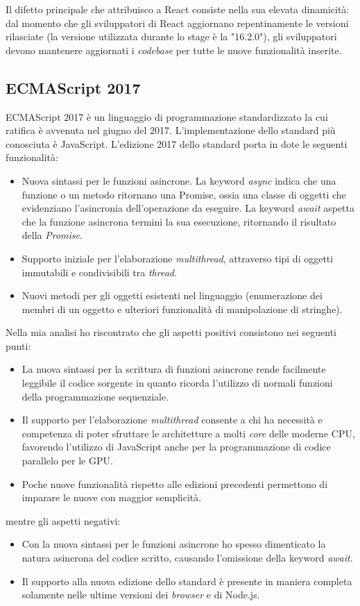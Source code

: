 Il difetto principale che attribuisco a React consiste nella sua elevata dinamicità: dal momento che gli sviluppatori di React aggiornano repentinamente le versioni rilasciate (la versione utilizzata durante lo stage è la "16.2.0"), gli sviluppatori devono mantenere aggiornati i \emph{codebase} per tutte le nuove funzionalità inserite.

\subsection{ECMAScript 2017}

ECMAScript 2017 è un linguaggio di programmazione standardizzato la cui ratifica è avvenuta nel giugno del 2017. L'implementazione dello standard più conosciuta è JavaScript.
L'edizione 2017 dello standard porta in dote le seguenti funzionalità:
\begin{itemize}
	\item Nuova sintassi per le funzioni asincrone. La keyword \emph{async} indica che una funzione o un metodo ritornano una Promise, ossia una classe di oggetti che evidenziano l'asincronia dell'operazione da eseguire. La keyword \emph{await} aspetta che la funzione asincrona termini la sua esecuzione, ritornando il risultato della \emph{Promise}.
	\item Supporto iniziale per l'elaborazione \emph{multithread}, attraverso tipi di oggetti immutabili e condivisibili tra \emph{thread}.
	\item Nuovi metodi per gli oggetti esistenti nel linguaggio (enumerazione dei membri di un oggetto e ulteriori funzionalità di manipolazione di stringhe).
\end{itemize}

Nella mia analisi ho riscontrato che gli aspetti positivi consistono nei seguenti punti:
\begin{itemize}
	\item La nuova sintassi per la scrittura di funzioni asincrone rende facilmente leggibile il codice sorgente in quanto ricorda l'utilizzo di normali funzioni della programmazione sequenziale.
	\item Il supporto per l'elaborazione \emph{multithread} consente a chi ha necessità e competenza di poter sfruttare le architetture a molti \emph{core} delle moderne CPU, favorendo l'utilizzo di JavaScript anche per la programmazione di codice parallelo per le GPU.
	\item Poche nuove funzionalità rispetto alle edizioni precedenti permettono di imparare le nuove con maggior semplicità.
\end{itemize}
mentre gli aspetti negativi:
\begin{itemize}
	\item Con la nuova sintassi per le funzioni asincrone ho spesso dimenticato la natura asincrona del codice scritto, causando l'omissione della keyword \emph{await}.
	\item Il supporto alla nuova edizione dello standard è presente in maniera completa solamente nelle ultime versioni dei \emph{browser} e di Node.js.\footnotemark
\end{itemize}


